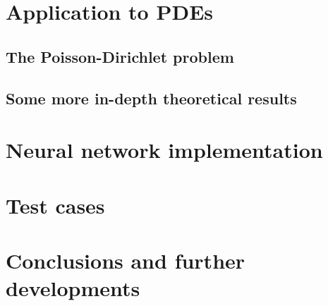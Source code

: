 \documentclass[12pt, a4paper]{report}
\theoremstyle{definition}
\begin{document}


\chapter{Application to PDEs}\label{chapter2}

\section{The Poisson-Dirichlet problem}\label{section2.1}

\section{Some more in-depth theoretical results}\label{section2.2}




\chapter{Neural network implementation}\label{chapter3}



\chapter{Test cases}\label{chapter4}



\chapter*{Conclusions and further developments}


\newpage
\begin{thebibliography}{10}
	
\end{thebibliography}
\end{document}
